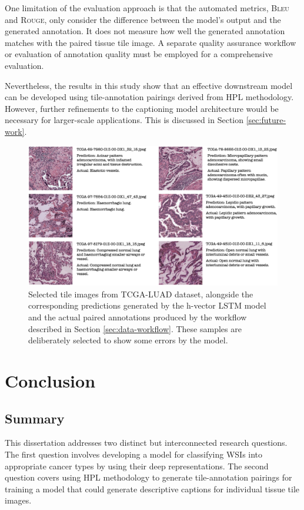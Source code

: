\documentclass{l4proj}
\begin{document}
One limitation of the evaluation approach is that the automated metrics, \textsc{Bleu} and \textsc{Rouge}, only consider the difference between the model's output and the generated annotation. It does not measure how well the generated annotation matches with the paired tissue tile image. A separate quality assurance workflow or evaluation of annotation quality must be employed for a comprehensive evaluation.

Nevertheless, the results in this study show that an effective downstream model can be developed using tile-annotation pairings derived from HPL methodology. However, further refinements to the captioning model architecture would be necessary for larger-scale applications. This is discussed in Section \ref{sec:future-work}.

\begin{figure}[h!]
    \centering
    \includegraphics[width=1\linewidth]{images/caption.png}
    \caption{Selected tile images from TCGA-LUAD dataset, alongside the corresponding predictions generated by the h-vector LSTM model and the actual paired annotations produced by the workflow described in Section \ref{sec:data-workflow}. These samples are deliberately selected to show some errors by the model.}
    \label{fig:caption}
\end{figure}

\chapter{Conclusion}    

\section{Summary}
This dissertation addresses two distinct but interconnected research questions. The first question involves developing a model for classifying WSIs into appropriate cancer types by using their deep representations. The second question covers using HPL methodology to generate tile-annotation pairings for training a model that could generate descriptive captions for individual tissue tile images.
\end{document}
